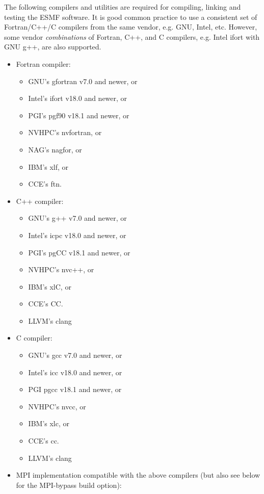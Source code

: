 

The following compilers and utilities are required for compiling, linking and
testing the ESMF software. It is good common practice to use a consistent set
of Fortran/C++/C compilers from the same vendor, e.g. GNU, Intel, etc.
However, some vendor {\em combinations} of Fortran, C++, and C compilers,
e.g. Intel ifort with GNU g++, are also supported.
\begin{itemize}
\item Fortran compiler:
  \begin{itemize}
  \item GNU's gfortran v7.0 and newer, or
  \item Intel's ifort v18.0 and newer, or
  \item PGI's pgf90 v18.1 and newer, or
  \item NVHPC's nvfortran, or
  \item NAG's nagfor, or
  \item IBM's xlf, or
  \item CCE's ftn.
  \end{itemize}
\item C++ compiler:
  \begin{itemize}
  \item GNU's g++ v7.0 and newer, or
  \item Intel's icpc v18.0 and newer, or
  \item PGI's pgCC v18.1 and newer, or
  \item NVHPC's nvc++, or
  \item IBM's xlC, or
  \item CCE's CC.
  \item LLVM's clang
  \end{itemize}
\item C compiler:
  \begin{itemize}
  \item GNU's gcc v7.0 and newer, or
  \item Intel's icc v18.0 and newer, or
  \item PGI pgcc v18.1 and newer, or
  \item NVHPC's nvcc, or
  \item IBM's xlc, or
  \item CCE's cc.
  \item LLVM's clang
  \end{itemize}
\item MPI implementation compatible with the above compilers (but also see below
for the MPI-bypass build option):

\end{itemize}
